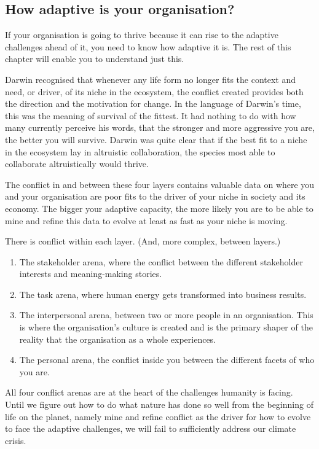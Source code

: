 \subsection{How adaptive is your organisation?}
If your organisation is going to thrive because it can rise to the adaptive challenges ahead of it, you need to know how adaptive it is. The rest of this chapter will enable you to understand just this. 


Darwin  recognised that whenever any life form no longer fits the context and need, or driver, of its niche in the ecosystem, the conflict created provides both the direction and the motivation for change. In the language of Darwin's time, this was the meaning of survival of the fittest. It had nothing to do with how many currently perceive his words, that the stronger and more aggressive you are, the better you will survive. Darwin was quite clear that if the best fit to a niche in the ecosystem lay in altruistic collaboration, the species most able to collaborate altruistically would thrive.


The conflict in and between these four layers contains valuable data on where you and your organisation are poor fits to the driver of your niche in society and its economy. The bigger your adaptive capacity, the more likely you are to be able to mine and refine this data to evolve at least as fast as your niche is moving.


There is conflict within each layer. (And, more complex,  between layers.) 
\begin{enumerate}
\item The stakeholder arena, where the conflict between the different stakeholder interests and meaning\hyp{}making stories.
\item The task arena, where human energy gets transformed into business results.
\item The interpersonal arena, between two or more people in an organisation. This is where the organisation’s culture is created and is the primary shaper of the reality that the organisation as a whole experiences.
\item The personal arena, the conflict inside you between the different facets of who you are.
\end{enumerate}


All four conflict arenas are at the heart of the challenges humanity is facing. Until we figure out how to do what nature has done so well from the beginning of life on the planet, namely mine and refine conflict as the driver for how to evolve to face the adaptive challenges, we will fail to sufficiently address our climate crisis.


